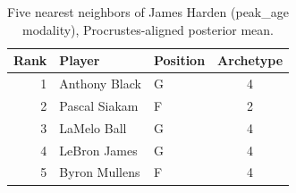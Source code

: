 \begin{table}[htbp]
  \centering\small
  \begin{tabular}{rllc}
    \toprule
    Rank & Player & Position & Archetype \\
    \midrule
    1 & Anthony Black & G & 4 \\
    2 & Pascal Siakam & F & 2 \\
    3 & LaMelo Ball & G & 4 \\
    4 & LeBron James & G & 4 \\
    5 & Byron Mullens & F & 4 \\
    \bottomrule
  \end{tabular}
  \caption{Five nearest neighbors of James Harden (peak_age modality), Procrustes-aligned posterior mean.}
  \label{tab:James_Harden_neighbors_peak_age}
\end{table}

